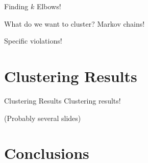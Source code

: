 \documentclass{beamer}
\begin{document}
\begin{frame}{Finding $k$}
Elbows!
\end{frame}

\begin{frame}{What do we want to cluster?}
Markov chains!

Specific violations!
\end{frame}

\section{Clustering Results}
\begin{frame}{Clustering Results}
Clustering results!

(Probably several slides)
\end{frame}

\section{Conclusions}
\begin{frame}{

\end{frame}
\end{document}
